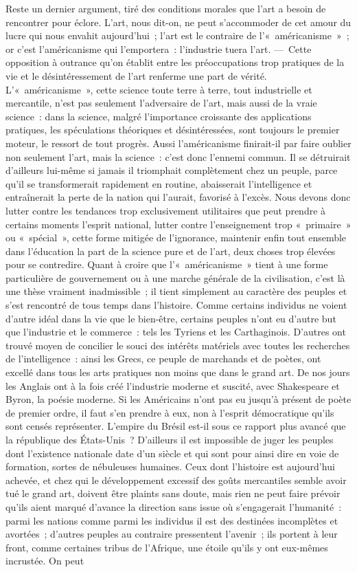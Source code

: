 \documentclass[french,twoside]{book} %
\begin{document}
Reste un dernier argument, tiré des conditions morales que l’art a besoin de rencontrer pour éclore. L’art, nous dit-on, ne peut s’accommoder de cet amour du lucre qui nous envahit aujourd’hui ; l’art est le contraire de l’« américanisme » ; or c’est l’américanisme qui l’emportera : l’industrie tuera l’art. — Cette opposition à outrance qu’on établit entre les préoccupations trop pratiques de la vie et le désintéressement de l’art renferme une part de vérité. L’« américanisme », cette science toute terre à terre, tout industrielle et mercantile, n’est pas seulement l’adversaire de l’art, mais aussi de la vraie science : dans la science, malgré l’importance croissante des applications pratiques, les spéculations théoriques et désintéressées, sont toujours le premier moteur, le ressort de tout progrès. Aussi l’américanisme finirait-il par faire oublier non seulement l’art, mais la science : c’est donc l’ennemi commun. Il se détruirait d’ailleurs lui-même si jamais il triomphait complètement chez un peuple, parce qu’il se transformerait rapidement en routine, abaisserait l’intelligence et entraînerait la perte de la nation qui l’aurait, favorisé à l’excès. Nous devons donc lutter contre les tendances trop exclusivement utilitaires que peut prendre à certains moments l’esprit national, lutter contre l’enseignement trop « primaire » ou « spécial », cette forme mitigée de l’ignorance, maintenir enfin tout ensemble dans l’éducation la part de la science pure et de l’art, deux choses trop élevées pour se contredire. Quant à croire que  l’« américanisme » tient à une forme particulière de gouvernement ou à une marche générale de la civilisation, c’est là une thèse vraiment inadmissible ; il tient simplement au caractère des peuples et s’est rencontré de tous temps dans l’histoire. Comme certains individus ne voient d’autre idéal dans la vie que le bien-être, certains peuples n’ont eu d’autre but que l’industrie et le commerce : tels les Tyriens et les Carthaginois. D’autres ont trouvé moyen de concilier le souci des intérêts matériels avec toutes les recherches de l’intelligence : ainsi les Grecs, ce peuple de marchands et de poètes, ont excellé dans tous les arts pratiques non moins que dans le grand art. De nos jours les Anglais ont à la fois créé l’industrie moderne et suscité, avec Shakespeare et Byron, la poésie moderne. Si les Américains n’ont pas eu jusqu’à présent de poète de premier ordre, il faut s’en prendre à eux, non à l’esprit démocratique qu’ils sont censés représenter. L’empire du Brésil est-il sous ce rapport plus avancé que la république des États-Unis ? D’ailleurs il est impossible de juger les peuples dont l’existence nationale date d’un siècle et qui sont pour ainsi dire en voie de formation, sortes de nébuleuses humaines. Ceux dont l’histoire est aujourd’hui achevée, et chez qui le développement excessif des goûts mercantiles semble avoir tué le grand art, doivent être plaints sans doute, mais rien ne peut faire prévoir qu’ils aient marqué d’avance la direction sans issue où s’engagerait l’humanité : parmi les nations comme parmi les individus il est des destinées incomplètes et avortées ; d’autres peuples au contraire pressentent l’avenir ; ils portent à leur  front, comme certaines tribus de l’Afrique, une étoile qu’ils y ont eux-mêmes incrustée. On peut 
\end{document}
